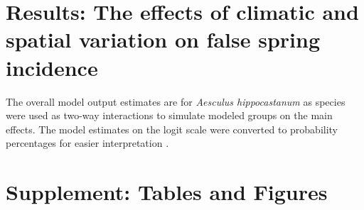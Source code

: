 \documentclass{article}\usepackage[]{graphicx}\usepackage[]{color}
\begin{document}
\section*{Results: The effects of climatic and spatial variation on false spring incidence}
The overall model output estimates are for \textit{Aesculus hippocastanum} as species were used as two-way interactions to simulate modeled groups on the main effects. The model estimates on the logit scale were converted to probability percentages for easier interpretation \citep{Gelman2006}. %

\newpage
\nocite{NPN2019}


\newpage
\section*{Supplement: Tables and Figures}
  
\end{document}
